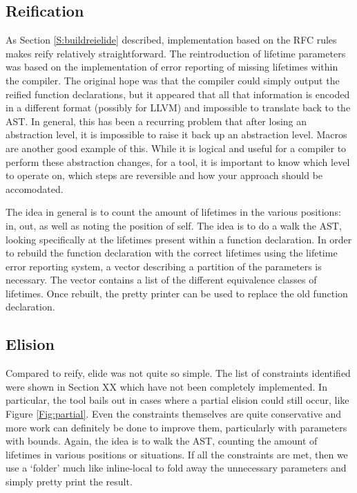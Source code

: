 \subsection{Reification}
As Section \ref{S:buildreielide} described, implementation based on the RFC rules makes reify relatively straightforward. The reintroduction of lifetime parameters was based on the implementation of error reporting of missing lifetimes within the compiler. The original hope was that the compiler could simply output the reified function declarations, but it appeared that all that information is encoded in a different format (possibly for LLVM) and impossible to translate back to the AST. In general, this has been a recurring problem that after losing an abstraction level, it is impossible to raise it back up an abstraction level. Macros are another good example of this. While it is logical and useful for a compiler to perform these abstraction changes, for a tool, it is important to know which level to operate on, which steps are reversible and how your approach should be accomodated.

The idea in general is to count the amount of lifetimes in the various positions: in, out, as well as noting the position of self. The idea is to do a walk the AST, looking specifically at the lifetimes present within a function declaration. In order to rebuild the function declaration with the correct lifetimes using the lifetime error reporting system, a vector describing a partition of the parameters is necessary. The vector contains a list of the different equivalence classes of lifetimes. Once rebuilt, the pretty printer can be used to replace the old function declaration.

\subsection{Elision}

Compared to reify, elide was not quite so simple. The list of constraints identified were shown in Section XX which have not been completely implemented. In particular, the tool bails out in cases where a partial elision could still occur, like Figure \ref{Fig:partial}. Even the constraints themselves are quite conservative and more work can definitely be done to improve them, particularly with parameters with bounds. Again, the idea is to walk the AST, counting the amount of lifetimes in various positions or situations. If all the constraints are met, then we use a `folder' much like inline-local to fold away the unnecessary parameters and simply pretty print the result.

